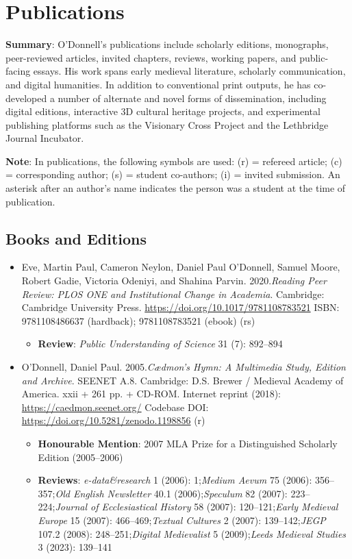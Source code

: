 \documentclass[12pt]{article}
\begin{document}
\section*{Publications}
\textbf{Summary}: O'Donnell's publications include scholarly editions, monographs, peer-reviewed articles, invited chapters, reviews, working papers, and public-facing essays. His work spans early medieval literature, scholarly communication, and digital humanities. In addition to conventional print outputs, he has co-developed a number of alternate and novel forms of dissemination, including digital editions, interactive 3D cultural heritage projects, and experimental publishing platforms such as the Visionary Cross Project and the Lethbridge Journal Incubator.

\textbf{Note}: In publications, the following symbols are used: (r) = refereed article; (c) = corresponding author; (s) = student co-authors; (i) = invited submission. An asterisk after an author's name indicates the person was a student at the time of publication.


\subsection*{Books and Editions}

\begin{itemize}
  \item Eve, Martin Paul, Cameron Neylon, Daniel Paul O’Donnell, Samuel Moore\*, Robert Gadie\*, Victoria Odeniyi\*, and Shahina Parvin\*. 2020.\textit{Reading Peer Review: PLOS ONE and Institutional Change in Academia}. Cambridge: Cambridge University Press. \url{https://doi.org/10.1017/9781108783521} ISBN: 9781108486637 (hardback); 9781108783521 (ebook) (rs)
\begin{itemize}
  \item \textbf{Review}: \textit{Public Understanding of Science} 31 (7): 892–894
\end{itemize}
  \item O’Donnell, Daniel Paul. 2005.\textit{Cædmon’s Hymn: A Multimedia Study, Edition and Archive}. SEENET A.8. Cambridge: D.S. Brewer / Medieval Academy of America. xxii + 261 pp. + CD-ROM. Internet reprint (2018): \url{https://caedmon.seenet.org/} Codebase DOI: \url{https://doi.org/10.5281/zenodo.1198856} (r)
\begin{itemize}
  \item \textbf{Honourable Mention}: 2007 MLA Prize for a Distinguished Scholarly Edition (2005–2006)
  \item \textbf{Reviews}: \textit{e-data\&research} 1 (2006): 1;\textit{Medium Aevum} 75 (2006): 356–357;\textit{Old English Newsletter} 40.1 (2006);\textit{Speculum} 82 (2007): 223–224;\textit{Journal of Ecclesiastical History} 58 (2007): 120–121;\textit{Early Medieval Europe} 15 (2007): 466–469;\textit{Textual Cultures} 2 (2007): 139–142;\textit{JEGP} 107.2 (2008): 248–251;\textit{Digital Medievalist} 5 (2009);\textit{Leeds Medieval Studies} 3 (2023): 139–141
\end{itemize}
\end{itemize}
\end{document}
